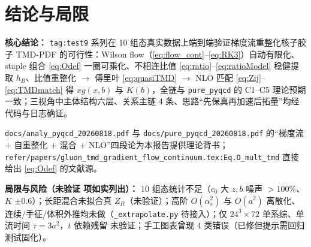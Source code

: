 \documentclass[UTF8]{ctexart}
\begin{document}
\section{结论与局限}
\begin{conclbox}
\textbf{核心结论：} \texttt{\nolinkurl{tag:test9}} 系列在 10 组态真实数据上端到端验证梯度流重整化核子胶子 TMD-PDF 的可行性：Wilson flow（\eqref{eq:flow_cont}--\eqref{eq:RK3}）自动有限化、staple 组合 \eqref{eq:Odef} 一圈可乘化、不相连比值 \eqref{eq:ratio}--\eqref{eq:ratioModel} 稳健提取 $h_B$、比值重整化 $\rightarrow$ 傅里叶 \eqref{eq:quasiTMD} $\rightarrow$ NLO 匹配 \eqref{eq:Zij}--\eqref{eq:TMDmatch} 得 $xg(x,b)$ 与 $K(b)$，全链与 \texttt{\nolinkurl{pure\_pyqcd}} 的 C1--C5 理论预期一致；三视角中主体结构六层、关系主链 4 条、思路“先保真再加速后拓量”均经代码与日志确证。
\end{conclbox}
\begin{refbox}
\texttt{\nolinkurl{docs/analy\_pyqcd\_20260818.pdf}} 与 \texttt{\nolinkurl{docs/pure\_pyqcd\_20260818.pdf}} 的“梯度流 $+$ 自重整化 $+$ 混合 $+$ NLO”四段论为本报告提供理论背书；\texttt{\nolinkurl{refer/papers/gluon\_tmd\_gradient\_flow\_continuum.tex:Eq.O\_mult\_tmd}} 直接给出 \eqref{eq:Odef} 的文献源。
\end{refbox}
\begin{warnbox}
\textbf{局限与风险（\textcolor{warn}{未验证} 项如实列出）：} 10 组态统计不足（$c_0$ 大 $z,b$ 噪声 $>100\%$、$K$ $\pm0.6$）；长距混合未拟合真 $Z_R$（\textcolor{warn}{未验证}）；高阶 $O(\alpha_s^2)$ 与 $O(a^2)$ 离散化、连续/手征/体积外推均未做（\texttt{\nolinkurl{\_extrapolate.py}} 待接入）；仅 $24^3\times72$ 单系综、单流时间 $\tau=3a^2$，$t$ 依赖残留 \textcolor{warn}{未验证}；手工图表曾现 4 类错误（已修但提示需回归测试固化）。
\end{warnbox}
\end{document}
